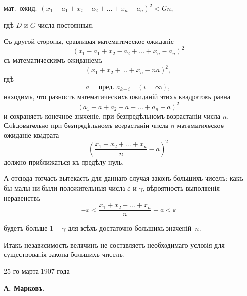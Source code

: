 \documentclass[12pt]{article}
\begin{document}
мат.\ ожид.\ $(x_1 - a_1 + x_2 - a_2 + \ldots + x_n - a_n)^2 < Gn,$

\noindent гдѣ $D$ и $G$ числа постоянныя.

Съ другой стороны, сравнивая математическое ожиданіе
\[
(x_1 - a_1 + x_2 - a_2 + \ldots + x_n - a_n)^2
\]
съ математическимъ ожиданіемъ
\[
(x_1 + x_2 + \ldots + x_n - na)^2,
\]
гдѣ
\[
a = \text{пред.}\; a_{k+i}\quad (i = \infty),
\]
находимъ, что разность математическихъ ожиданій этихъ
квадратовъ равна
\[
(a_1 - a + a_2 - a + \ldots + a_n - a)^2
\]
и сохраняетъ конечное значеніе, при безпредѣльномъ возра\-станіи числа $n$. Слѣдовательно при безпредѣльномъ возра\-станіи числа $n$ математическое ожиданіе квадрата
\[
\left(\frac{x_1 + x_2 + \ldots + x_n}{n} - a\right)^2
\]
должно приближаться къ предѣлу нуль.

А отсюда тотчасъ вытекаетъ для даннаго случая законъ
большихъ чиселъ: какъ бы малы ни были положительныя чи\-сла $\varepsilon$ и $\gamma$, вѣроятность выполненія неравенствъ
\[
-\varepsilon < \frac{x_1 + x_2 + \ldots + x_n}{n} - a < \varepsilon
\]


будетъ больше $1 - \gamma$ для всѣхъ достаточно большихъ значе\-ній~$n$.

Итакъ независимость величинъ не составляетъ необхо\-димаго условія для существованія закона большихъ чиселъ.

\bigskip

\noindent\hspace{2em}25-го марта 1907 года

\begin{flushright}
\textbf{А. Марковъ.}
\end{flushright}
\end{document}
